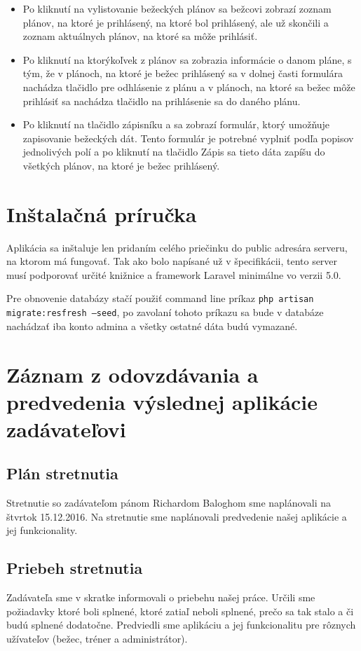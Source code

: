 \documentclass[12pt,a4paper]{report}
\theoremstyle{definition}
\theoremstyle{remark}
\begin{document}
\begin{itemize}
\item Po kliknutí na vylistovanie bežeckých plánov sa bežcovi zobrazí zoznam plánov, na ktoré je prihlásený, na ktoré bol prihlásený, ale už skončili a zoznam aktuálnych plánov, na ktoré sa môže prihlásiť. 
\item Po kliknutí na ktorýkoľvek z plánov sa zobrazia informácie o danom pláne, s tým, že v plánoch, na ktoré je bežec prihlásený sa v dolnej časti formulára nachádza tlačidlo pre odhlásenie z plánu a v plánoch, na ktoré sa bežec môže prihlásiť sa nachádza tlačidlo na prihlásenie sa do daného plánu.
\item Po kliknutí na tlačidlo zápisníku a sa zobrazí formulár, ktorý umožňuje zapisovanie bežeckých dát. Tento formulár je potrebné vyplniť podľa popisov jednolivých polí a po kliknutí na tlačidlo Zápis sa tieto dáta zapíšu do všetkých plánov, na ktoré je bežec prihlásený.
\end{itemize}


\chapter{Inštalačná príručka}
Aplikácia sa inštaluje len pridaním celého priečinku do public adresára serveru, na ktorom má fungovať. Tak ako bolo napísané už v špecifikácii, tento server musí podporovať určité knižnice a framework Laravel minimálne vo verzii 5.0.

Pre obnovenie databázy stačí použiť command line príkaz \texttt{php artisan migrate:resfresh --seed}, po zavolaní tohoto príkazu sa bude v databáze nachádzať iba konto admina a všetky ostatné dáta budú vymazané.

\chapter{Záznam z odovzdávania a predvedenia výslednej aplikácie zadávateľovi}
\section{Plán stretnutia}
Stretnutie so zadávateľom pánom Richardom Baloghom sme naplánovali na štvrtok
15.12.2016. Na stretnutie sme naplánovali predvedenie našej aplikácie a jej funkcionality.

\section{Priebeh stretnutia}
Zadávateľa sme v skratke informovali o priebehu našej práce. Určili sme požiadavky ktoré
boli splnené, ktoré zatiaľ neboli splnené, prečo sa tak stalo a či budú splnené dodatočne.
Predviedli sme aplikáciu a jej funkcionalitu pre rôznych užívateľov (bežec, tréner a administrátor).
\end{document}
